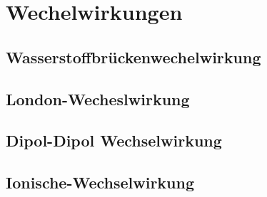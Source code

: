 \section{Wechelwirkungen}
\subsection{Wasserstoffbrückenwechelwirkung}
\subsection{London-Wecheslwirkung}
\subsection{Dipol-Dipol Wechselwirkung}
\subsection{Ionische-Wechselwirkung}
